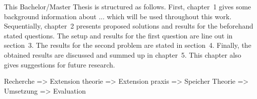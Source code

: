This Bachelor/Master Thesis is structured as follows. First, chapter~1 gives some background information about ... which will be used throughout this work. Sequentially, chapter~2 presents proposed solutions and results for the beforehand stated questions. The setup and results for the first question are line out in section~3. The results for the second problem are stated in section~4. Finally, the obtained results are discussed and summed up in chapter~5. This chapter also gives suggestions for future research.


Recherche => Extension theorie => Extension praxis => Speicher Theorie => Umsetzung => Evaluation

















